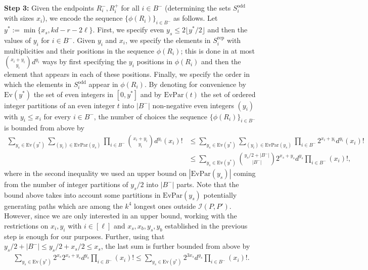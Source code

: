 \documentclass[reqno,final,a4paper]{amsart}
\theoremstyle{definition}
\newcommand{\cI}{\mathcal{I}}
\newcommand{\1}{\mathbbm{1}}
\begin{document}
\vspace{0.5em}
\noindent 
\textbf{Step 3:} Given the endpoints $R_i^-,R_i^+$ for all $i\in B^-$ (determining the sets $S_i^{\mathrm{odd}}$ with sizes $x_i$), we encode the sequence $\{\phi(R_i)\}_{i\in B^-}$ as follows. Let $y^*:= \min\{x_s, kd-r-2\ell\}$.
First, we specify even $y_s \le 2\lfloor y^*/2\rfloor$ and then the values of $y_i$ for $i\in B^-$. 
Given $y_i$ and $x_i$, we specify the elements in $S_i^{\mathrm{rep}}$ with multiplicities and their positions in the sequence $\phi(R_i)$; this is done in at most $\binom{x_i+y_i}{y_i} d^{y_i}$ ways by first specifying the $y_i$ positions in $\phi(R_i)$ and then the element that appears in each of these positions. Finally, we specify the order in which the elements in $S_i^{\mathrm{odd}}$ appear in $\phi(R_i)$. 
By denoting for convenience by $\mathrm{Ev}(y^*)$ the set of even integers in $[0,y^*]$ and by $\mathrm{EvPar}(t)$ the set of ordered integer partitions of an even integer $t$ into $|B^-|$ non-negative even integers $(y_i)$ with $y_i\le x_i$ for every $i\in B^-$, the number of choices the sequence $\{\phi(R_i)\}_{i\in B^-}$ is bounded from above by
\begin{align*}
\sum_{y_s\in \mathrm{Ev}(y^*)} \sum_{(y_i)\in \mathrm{EvPar}(y_s)} \prod_{i\in B^-} \binom{x_i+y_i}{y_i} d^{y_i}  (x_i)! 
&\leq  \sum_{y_s\in \mathrm{Ev}(y^*)} \sum_{(y_i)\in \mathrm{EvPar}(y_s)} \prod_{i\in B^-} 2^{x_i+y_i} d^{y_i} (x_i)!\\
&\leq  \sum_{y_s\in \mathrm{Ev}(y^*)} \binom{y_s/2+|B^-|}{|B^-|} 2^{x_s+ y_s} d^{y_s}  \prod_{i\in B^-}  (x_i)!,  
\end{align*}
where in the second inequality we used an upper bound on $|\mathrm{EvPar}(y_s)|$ coming from the number of integer partitions of $y_s/2$ into $|B^-|$ parts. 
Note that the bound above takes into account some partitions in $\mathrm{EvPar}(y_s)$ potentially generating paths which are among the $k^4$ longest ones outside $\cI(P,P')$. However, since we are only interested in an upper bound, working with the restrictions on $x_i,y_i$ with $i\in [\ell]$ and $x_s,x_b,y_s,y_b$ established in the previous step is enough for our purposes.
Further, using that $y_s/2+|B^-|\le y_s/2+x_s/2\le x_s$, the last sum is further bounded from above by
\begin{align}\label{eq:step3}
\sum_{y_s\in \mathrm{Ev}(y^*)} 2^{x_s} 2^{x_s+ y_s} d^{y_s} \prod_{i\in B^-}(x_i)!\leq \sum_{y_s\in \mathrm{Ev}(y^*)} 2^{3x_s} d^{y_s} \prod_{i\in B^-} (x_i)!. 
\end{align}
\end{document}
